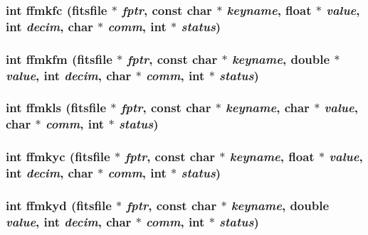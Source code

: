 \subsubsection{\setlength{\rightskip}{0pt plus 5cm}int ffmkfc (\bf{fitsfile} $\ast$ {\em fptr}, const char $\ast$ {\em keyname}, float $\ast$ {\em value}, int {\em decim}, char $\ast$ {\em comm}, int $\ast$ {\em status})}\label{fitsio_8h_633909c19524d20d0f757d3454a079ca}


\subsubsection{\setlength{\rightskip}{0pt plus 5cm}int ffmkfm (\bf{fitsfile} $\ast$ {\em fptr}, const char $\ast$ {\em keyname}, double $\ast$ {\em value}, int {\em decim}, char $\ast$ {\em comm}, int $\ast$ {\em status})}\label{fitsio_8h_61e22f498132381f2531f83d38d73928}


\subsubsection{\setlength{\rightskip}{0pt plus 5cm}int ffmkls (\bf{fitsfile} $\ast$ {\em fptr}, const char $\ast$ {\em keyname}, char $\ast$ {\em value}, char $\ast$ {\em comm}, int $\ast$ {\em status})}\label{fitsio_8h_0aa39e70d811c97a58750827ab3ad201}


\subsubsection{\setlength{\rightskip}{0pt plus 5cm}int ffmkyc (\bf{fitsfile} $\ast$ {\em fptr}, const char $\ast$ {\em keyname}, float $\ast$ {\em value}, int {\em decim}, char $\ast$ {\em comm}, int $\ast$ {\em status})}\label{fitsio_8h_7e6d14931514dc9721cfc11506d550cf}


\subsubsection{\setlength{\rightskip}{0pt plus 5cm}int ffmkyd (\bf{fitsfile} $\ast$ {\em fptr}, const char $\ast$ {\em keyname}, double {\em value}, int {\em decim}, char $\ast$ {\em comm}, int $\ast$ {\em status})}\label{fitsio_8h_2f427b6b25fee401214df98e56ebc429}


